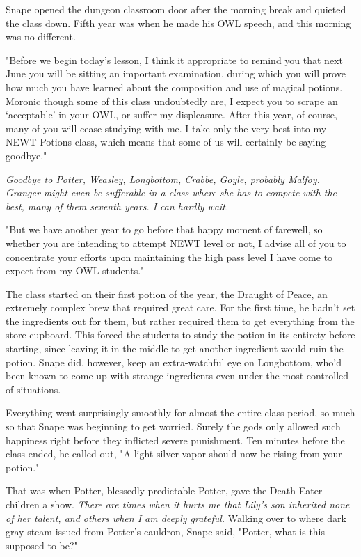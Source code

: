 Snape opened the dungeon classroom door after the morning break and quieted the class down. Fifth year was when he made his OWL speech, and this morning was no different.

"Before we begin today's lesson, I think it appropriate to remind you that next June you will be sitting an important examination, during which you will prove how much you have learned about the composition and use of magical potions. Moronic though some of this class undoubtedly are, I expect you to scrape an `acceptable' in your OWL, or suffer my displeasure. After this year, of course, many of you will cease studying with me. I take only the very best into my NEWT Potions class, which means that some of us will certainly be saying goodbye."

\emph{Goodbye to Potter, Weasley, Longbottom, Crabbe, Goyle, probably Malfoy. Granger might even be sufferable in a class where she has to compete with the best, many of them seventh years. I can hardly wait.}

"But we have another year to go before that happy moment of farewell, so whether you are intending to attempt NEWT level or not, I advise all of you to concentrate your efforts upon maintaining the high pass level I have come to expect from my OWL students."

The class started on their first potion of the year, the Draught of Peace, an extremely complex brew that required great care. For the first time, he hadn't set the ingredients out for them, but rather required them to get everything from the store cupboard. This forced the students to study the potion in its entirety before starting, since leaving it in the middle to get another ingredient would ruin the potion. Snape did, however, keep an extra-watchful eye on Longbottom, who'd been known to come up with strange ingredients even under the most controlled of situations.

Everything went surprisingly smoothly for almost the entire class period, so much so that Snape was beginning to get worried. Surely the gods only allowed such happiness right before they inflicted severe punishment. Ten minutes before the class ended, he called out, "A light silver vapor should now be rising from your potion."

That was when Potter, blessedly predictable Potter, gave the Death Eater children a show. \emph{There are times when it hurts me that Lily's son inherited none of her talent, and others when I am deeply grateful.} Walking over to where dark gray steam issued from Potter's cauldron, Snape said, "Potter, what is this supposed to be?"

